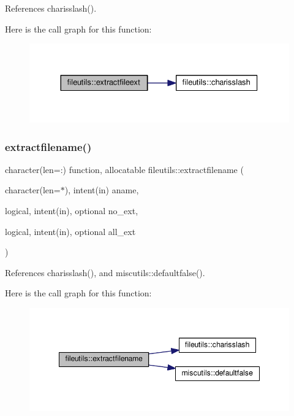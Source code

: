 References charisslash().

Here is the call graph for this function\+:
\nopagebreak
\begin{figure}[H]
\begin{center}
\leavevmode
\includegraphics[width=330pt]{namespacefileutils_a58b75841484f583d4f7da47c8fa217b6_cgraph}
\end{center}
\end{figure}
\mbox{\label{namespacefileutils_a3a05468f7b2b38570ebb0f21256d2bfb}} 
\subsubsection{\texorpdfstring{extractfilename()}{extractfilename()}}
{\footnotesize\ttfamily character(len=\+:) function, allocatable fileutils\+::extractfilename (\begin{DoxyParamCaption}\item[{character(len=$\ast$), intent(in)}]{aname,  }\item[{logical, intent(in), optional}]{no\+\_\+ext,  }\item[{logical, intent(in), optional}]{all\+\_\+ext }\end{DoxyParamCaption})\hspace{0.3cm}{\ttfamily [private]}}



References charisslash(), and miscutils\+::defaultfalse().

Here is the call graph for this function\+:
\nopagebreak
\begin{figure}[H]
\begin{center}
\leavevmode
\includegraphics[width=348pt]{namespacefileutils_a3a05468f7b2b38570ebb0f21256d2bfb_cgraph}
\end{center}
\end{figure}
\mbox{\label{namespacefileutils_a5debf7f081524e507253598ba943ad1a}} 
